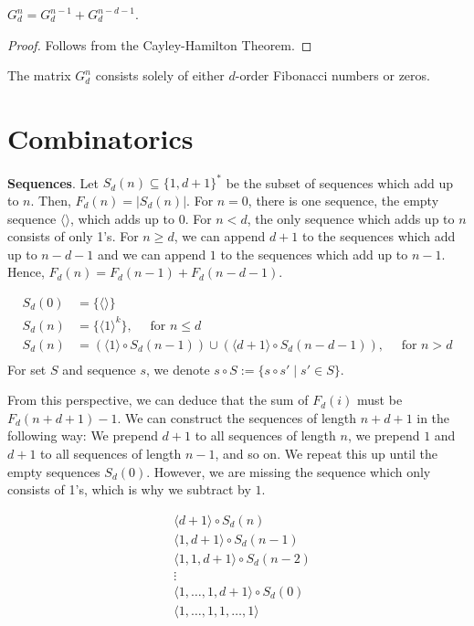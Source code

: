 \documentclass[english,version-2020-11]{uzl-thesis}
\begin{document}
\begin{lemma}
  $G_d^n = G_d^{n - 1} + G_d^{n - d - 1}$.
\end{lemma}

\begin{proof}
  Follows from the Cayley-Hamilton Theorem.
\end{proof}

\begin{corollary}
  The matrix $G_d^n$ consists solely of either $d$-order Fibonacci numbers or zeros.
\end{corollary}

\section{Combinatorics}

\textbf{Sequences}.
Let $S_d(n) \subseteq \{1, d + 1\}^*$ be the subset of sequences which add up to $n$.
Then, $F_d(n) = |S_d(n)|$.
For $n = 0$, there is one sequence, the empty sequence $\langle\rangle$, which adds up to $0$.
For $n < d$, the only sequence which adds up to $n$ consists of only 1's.
For $n \ge d$, we can append $d + 1$ to the sequences which add up to $n - d - 1$
and we can append $1$ to the sequences which add up to $n - 1$.
Hence, $F_d(n) = F_d(n - 1) + F_d(n - d - 1)$.

\begin{align*}
  S_d(0) &= \{\langle\rangle\} \\
  S_d(n) &= \{\langle 1 \rangle^k\}, \quad \text{ for } n \le d \\
  S_d(n) &= (\langle 1 \rangle \circ S_d(n - 1)) \cup (\langle d + 1 \rangle \circ S_d(n - d - 1)), \quad \text{ for } n > d \\
\end{align*}
For set $S$ and sequence $s$, we denote $s \circ S := \{ s \circ s' \mid s' \in S \}$.

From this perspective, we can deduce that the sum of $F_d(i)$ must be $F_d(n + d + 1) - 1$.
We can construct the sequences of length $n + d + 1$ in the following way:
We prepend $d + 1$ to all sequences of length $n$,
we prepend $1$ and $d + 1$ to all sequences of length $n - 1$, and so on.
We repeat this up until the empty sequences $S_d(0)$.
However, we are missing the sequence which only consists of 1's, which is why we subtract by $1$.

\begin{align*}
  & \langle d + 1 \rangle \circ S_d(n) \\
  & \langle 1, d + 1 \rangle \circ S_d(n - 1) \\
  & \langle 1, 1, d + 1 \rangle \circ S_d(n - 2) \\
  & \vdots \\
  & \langle 1, \dots, 1, d + 1 \rangle \circ S_d(0) \\
  & \langle 1, \dots, 1, 1, \dots, 1 \rangle \\
\end{align*}
\end{document}
